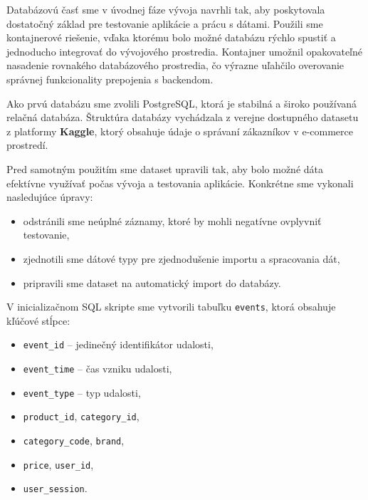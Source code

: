 \documentclass[a4paper, 12pt]{article}
\begin{document}
Databázovú časť sme v úvodnej fáze vývoja navrhli tak, aby poskytovala dostatočný základ pre testovanie aplikácie a prácu s dátami. 
Použili sme kontajnerové riešenie, vďaka ktorému bolo možné databázu rýchlo spustiť a jednoducho integrovať do vývojového prostredia. 
Kontajner umožnil opakovateľné nasadenie rovnakého databázového prostredia, čo výrazne uľahčilo overovanie správnej funkcionality prepojenia s backendom.

Ako prvú databázu sme zvolili PostgreSQL, ktorá je stabilná a široko používaná relačná databáza. 
Štruktúra databázy vychádzala z verejne dostupného datasetu z platformy  \textbf{Kaggle}, ktorý obsahuje údaje o správaní zákazníkov v e-commerce prostredí.\newline 

Pred samotným použitím sme dataset upravili tak, aby bolo možné dáta efektívne využívať počas vývoja a testovania aplikácie. 
Konkrétne sme vykonali nasledujúce úpravy:

\begin{itemize}
    \item odstránili sme neúplné záznamy, ktoré by mohli negatívne ovplyvniť testovanie,
    \item zjednotili sme dátové typy pre zjednodušenie importu a spracovania dát,
    \item pripravili sme dataset na automatický import do databázy.\newline
\end{itemize}

\noindent 
V inicializačnom SQL skripte sme vytvorili tabuľku \texttt{events}, ktorá obsahuje kľúčové stĺpce:

\begin{itemize}
    \item \texttt{event\_id} – jedinečný identifikátor udalosti,
    \item \texttt{event\_time} – čas vzniku udalosti,
    \item \texttt{event\_type} – typ udalosti,
    \item \texttt{product\_id}, \texttt{category\_id},
    \item \texttt{category\_code}, \texttt{brand},
    \item \texttt{price}, \texttt{user\_id},
    \item \texttt{user\_session}.\newline
\end{itemize}
\end{document}
